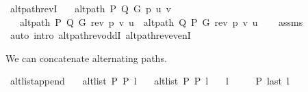 \begin{isabellebody}
\isamarkupfalse%
%
\endisatagproof
{\isafoldproof}%
%
\isadelimproof
%
\endisadelimproof
\isanewline
%
\isadeliminvisible
\isanewline
%
\endisadeliminvisible
%
\isataginvisible
{}\isamarkupfalse%
\ alt{\isacharunderscore}{\kern0pt}path{\isacharunderscore}{\kern0pt}revI{\isacharcolon}{\kern0pt}\isanewline
\ \ \ {\isachardoublequoteopen}alt{\isacharunderscore}{\kern0pt}path\ P\ Q\ G\ p\ u\ v{\isachardoublequoteclose}\isanewline
\ \ \ {\isachardoublequoteopen}alt{\isacharunderscore}{\kern0pt}path\ P\ Q\ G\ {\isacharparenleft}{\kern0pt}rev\ p{\isacharparenright}{\kern0pt}\ v\ u\ {\isasymor}\ alt{\isacharunderscore}{\kern0pt}path\ Q\ P\ G\ {\isacharparenleft}{\kern0pt}rev\ p{\isacharparenright}{\kern0pt}\ v\ u{\isachardoublequoteclose}%
\endisataginvisible
{\isafoldinvisible}%
%
\isadeliminvisible
%
\endisadeliminvisible
\isanewline
%
\isadelimproof
\ \ %
\endisadelimproof
%
\isatagproof
{}\isamarkupfalse%
\ assms\isanewline
\ \ \isamarkupfalse%
\ {\isacharparenleft}{\kern0pt}auto\ intro{\isacharcolon}{\kern0pt}\ alt{\isacharunderscore}{\kern0pt}path{\isacharunderscore}{\kern0pt}rev{\isacharunderscore}{\kern0pt}oddI\ alt{\isacharunderscore}{\kern0pt}path{\isacharunderscore}{\kern0pt}rev{\isacharunderscore}{\kern0pt}evenI{\isacharparenright}{\kern0pt}%
\endisatagproof
{\isafoldproof}%
%
\isadelimproof
%
\endisadelimproof
%
\begin{isamarkuptext}%
We can concatenate alternating paths.%
\end{isamarkuptext}\isamarkuptrue%
%
\isadeliminvisible
%
\endisadeliminvisible
%
\isataginvisible
{}\isamarkupfalse%
\ alt{\isacharunderscore}{\kern0pt}list{\isacharunderscore}{\kern0pt}append{\isacharunderscore}{\kern0pt}{}{\isacharprime}{\kern0pt}{\isacharcolon}{\kern0pt}\isanewline
\ \ \ {\isachardoublequoteopen}alt{\isacharunderscore}{\kern0pt}list\ P{}\ P{}\ l{}{\isachardoublequoteclose}\isanewline
\ \ \ {\isachardoublequoteopen}alt{\isacharunderscore}{\kern0pt}list\ P{}\ P{}\ l{}{\isachardoublequoteclose}\isanewline
\ \ \ {\isachardoublequoteopen}l{}\ {\isasymnoteq}\ {\isacharbrackleft}{\kern0pt}{\isacharbrackright}{\kern0pt}{\isachardoublequoteclose}\isanewline
\ \ \ {\isachardoublequoteopen}P{}\ {\isacharparenleft}{\kern0pt}last\ l{}{\isacharparenright}{\kern0pt}{\isachardoublequoteclose}\isanewline

\end{isabellebody}
